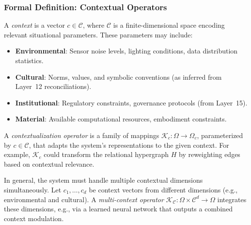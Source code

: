 \subsubsection{Formal Definition: Contextual Operators}
\begin{definition}
A \emph{context} is a vector $c \in \mathcal{C}$, where $\mathcal{C}$ is a finite-dimensional space encoding relevant situational parameters. These parameters may include:
\begin{itemize}
    \item \textbf{Environmental}: Sensor noise levels, lighting conditions, data distribution statistics.
    \item \textbf{Cultural}: Norms, values, and symbolic conventions (as inferred from Layer~12 reconciliations).
    \item \textbf{Institutional}: Regulatory constraints, governance protocols (from Layer~15).
    \item \textbf{Material}: Available computational resources, embodiment constraints.
\end{itemize}
\end{definition}

\begin{definition}
A \emph{contextualization operator} is a family of mappings $\mathcal{K}_c: \Omega \to \Omega_c$, parameterized by $c \in \mathcal{C}$, that adapts the system's representations to the given context. For example, $\mathcal{K}_c$ could transform the relational hypergraph $H$ by reweighting edges based on contextual relevance.
\end{definition}

\begin{definition}
In general, the system must handle multiple contextual dimensions simultaneously. Let $c_1, \dots, c_d$ be context vectors from different dimensions (e.g., environmental and cultural). A \emph{multi-context operator} $\mathcal{K}_{\mathcal{C}}: \Omega \times \mathcal{C}^d \to \Omega$ integrates these dimensions, e.g., via a learned neural network that outputs a combined context modulation.
\end{definition}

